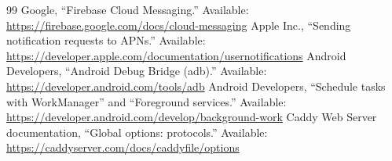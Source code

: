{\begin{thebibliography}{99}
 Google, ``Firebase Cloud Messaging.'' Available: \url{https://firebase.google.com/docs/cloud-messaging}
 Apple Inc., ``Sending notification requests to APNs.'' Available: \url{https://developer.apple.com/documentation/usernotifications}
 Android Developers, ``Android Debug Bridge (adb).'' Available: \url{https://developer.android.com/tools/adb}
 Android Developers, ``Schedule tasks with WorkManager'' and ``Foreground services.'' Available: \url{https://developer.android.com/develop/background-work}
 Caddy Web Server documentation, ``Global options: protocols.'' Available: \url{https://caddyserver.com/docs/caddyfile/options}
\end{thebibliography}}
